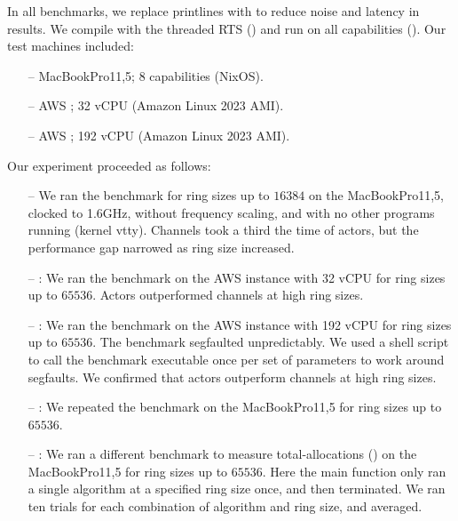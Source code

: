 \documentclass[sigplan,screen]{acmart}
\begin{document}
In all benchmarks, we replace printlines with 
to reduce noise and latency in results.
We compile with the threaded RTS () and run on all capabilities
().
Our test machines included:
%
\begin{itemize}[leftmargin=1em]
    \item[--] MacBookPro11,5; 8 capabilities (NixOS).
    \item[--] AWS ; 32 vCPU (\small{Amazon Linux 2023 AMI}).
    \item[--] AWS ; 192 vCPU (\small{Amazon Linux 2023 AMI}).
\end{itemize}
%
Our experiment proceeded as follows:
%
\begin{itemize}[leftmargin=1em]
    \item[--] We ran the  benchmark for ring sizes up to
    $16384$ on the MacBookPro11,5, clocked to 1.6GHz, without
    frequency scaling, and with no other programs running (kernel vtty).
    Channels took a third the time of actors, but
    the performance gap narrowed as ring size increased.

    \item[--] :
    We ran the benchmark on the AWS  instance with 32 vCPU
    for ring sizes up to $65536$.
    Actors outperformed channels at high ring sizes.

    \item[--] :
    We ran the benchmark on the AWS  instance with 192 vCPU
    for ring sizes up to $65536$.
    The benchmark segfaulted unpredictably.
    We used a shell script to call the benchmark executable once per set of
    parameters to work around segfaults.
    We confirmed that actors outperform channels at high ring sizes.

    \item[--] :
    We repeated the benchmark on the MacBookPro11,5
    for ring sizes up to $65536$.

    \item[--] :
    We ran a different benchmark
    to measure total-allocations ()
    on the MacBookPro11,5
    for ring sizes up to $65536$.
    Here the main function only ran a single algorithm at a
    specified ring size once, and then terminated.
    We ran ten trials for each combination of algorithm and ring size, and averaged.
\end{itemize}
\end{document}

